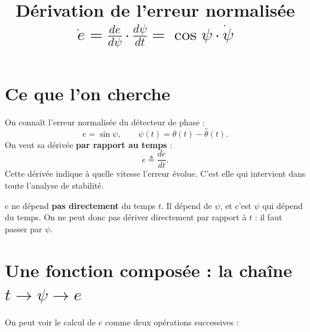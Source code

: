 \documentclass[11pt,a4paper]{article}
\title{\textbf{Dérivation de l'erreur normalisée}\\[4pt]
$\displaystyle \dot e = \frac{de}{d\psi}\cdot\frac{d\psi}{dt} = \cos\psi\cdot\dot\psi$}
\date{}
\numberwithin{equation}{section}
\newcommand{\hth}{\hat{\theta}}
\begin{document}
\maketitle

\section{Ce que l'on cherche}

On connaît l'erreur normalisée du détecteur de phase :
\begin{equation}\label{eq:e}
e = \sin\psi,\qquad \psi(t) = \theta(t)-\hth(t).
\end{equation}
On veut sa dérivée \textbf{par rapport au temps} :
\begin{equation}
\dot e \triangleq \frac{de}{dt}.
\end{equation}
Cette dérivée indique à quelle vitesse l'erreur évolue. C'est elle qui intervient dans toute
l'analyse de stabilité.

\begin{attention}
$e$ ne dépend \textbf{pas directement} du temps $t$. Il dépend de $\psi$, et c'est $\psi$ qui dépend du temps.
On ne peut donc pas dériver \og directement\fg{} par rapport à $t$ : il faut passer par $\psi$.
\end{attention}

\section{Une fonction composée : la chaîne $t\to\psi\to e$}

On peut voir le calcul de $e$ comme deux opérations successives :

\begin{center}
\end{center}
\end{document}
